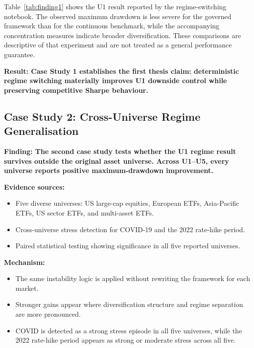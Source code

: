 \documentclass[11pt]{article}
\newcommand{\finding}[1]{{\large\textbf{\textcolor{resultgreen}{Finding: }}\textbf{#1}}}
\newcommand{\result}[1]{{\large\textbf{\textcolor{resultgreen}{Result: }}\textbf{#1}}}
\begin{document}
Table~\ref{tab:finding1} shows the U1 result reported by the regime-switching notebook. The observed maximum drawdown is less severe for the governed framework than for the continuous benchmark, while the accompanying concentration measures indicate broader diversification. These comparisons are descriptive of that experiment and are not treated as a general performance guarantee.

\result{Case Study 1 establishes the first thesis claim: deterministic regime switching materially improves U1 downside control while preserving competitive Sharpe behaviour.}

\subsection{Case Study 2: Cross-Universe Regime Generalisation}

\finding{The second case study tests whether the U1 regime result survives outside the original asset universe. Across U1--U5, every universe reports positive maximum-drawdown improvement.}

\textbf{Evidence sources:}
\begin{itemize}
  \item Five diverse universes: US large-cap equities, European ETFs, Asia-Pacific ETFs, US sector ETFs, and multi-asset ETFs.
  \item Cross-universe stress detection for COVID-19 and the 2022 rate-hike period.
  \item Paired statistical testing showing significance in all five reported universes.
\end{itemize}

\textbf{Mechanism:}
\begin{itemize}
  \item The same instability logic is applied without rewriting the framework for each market.
  \item Stronger gains appear where diversification structure and regime separation are more pronounced.
  \item COVID is detected as a strong stress episode in all five universes, while the 2022 rate-hike period appears as strong or moderate stress across all five.
\end{itemize}
\end{document}
